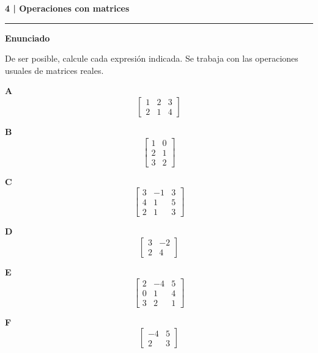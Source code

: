\documentclass[11pt,a4paper,landscape]{article}
\newcommand{\titulo}[1]{{\LARGE\bfseries #1}\par\smallskip\hrule\medskip}
\begin{document}
\newpage{}\hypertarget{1.2-4}{}
\titulo{4 | Operaciones con matrices}
\textbf{Enunciado}\par De ser posible, calcule cada expresión indicada. Se trabaja con las operaciones usuales de matrices reales.
\par\smallskip \begin{minipage}[t]{.47\linewidth}\centering \textbf{A}\[\begin{bmatrix}1 & 2 & 3\\2 & 1 & 4\end{bmatrix}\]\end{minipage}\hfill\begin{minipage}[t]{.47\linewidth}\centering \textbf{B}\[\begin{bmatrix}1 & 0\\2 & 1\\3 & 2\end{bmatrix}\]\end{minipage}\par\smallskip
\par\smallskip \begin{minipage}[t]{.47\linewidth}\centering \textbf{C}\[\begin{bmatrix}3 & -1 & 3\\4 & 1 & 5\\2 & 1 & 3\end{bmatrix}\]\end{minipage}\hfill\begin{minipage}[t]{.47\linewidth}\centering \textbf{D}\[\begin{bmatrix}3 & -2\\2 & 4\end{bmatrix}\]\end{minipage}\par\smallskip
\par\smallskip \begin{minipage}[t]{.47\linewidth}\centering \textbf{E}\[\begin{bmatrix}2 & -4 & 5\\0 & 1 & 4\\3 & 2 & 1\end{bmatrix}\]\end{minipage}\hfill\begin{minipage}[t]{.47\linewidth}\centering \textbf{F}\[\begin{bmatrix}-4 & 5\\2 & 3\end{bmatrix}\]\end{minipage}\par\smallskip
\end{document}

